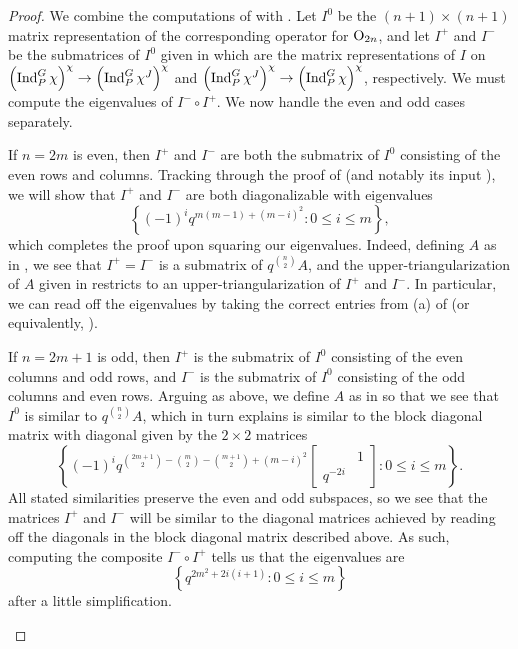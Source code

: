 \begin{proof}
    We combine the computations of  with . Let $I^0$ be the $(n+1)\times(n+1)$ matrix representation of the corresponding operator for $\mathrm{O}_{2n}$, and let $I^+$ and $I^-$ be the submatrices of $I^0$ given in  which are the matrix representations of $I$ on $\left(\operatorname{Ind}_P^G\chi\right)^\chi\to\left(\operatorname{Ind}_P^G\chi^J\right)^\chi$ and $\left(\operatorname{Ind}_P^G\chi^J\right)^\chi\to\left(\operatorname{Ind}_P^G\chi\right)^\chi$, respectively. We must compute the eigenvalues of $I^-\circ I^+$. We now handle the even and odd cases separately.
    \begin{listalph}
        \item If $n=2m$ is even, then $I^+$ and $I^-$ are both the submatrix of $I^0$ consisting of the even rows and columns. Tracking through the proof of  (and notably its input ), we will show that $I^+$ and $I^-$ are both diagonalizable with eigenvalues
        \[\left\{(-1)^{i}q^{m(m-1)+(m-i)^2}:0\le i\le m\right\},\]
        which completes the proof upon squaring our eigenvalues. Indeed, defining $A$ as in , we see that $I^+=I^-$ is a submatrix of $q^{\binom n2}A$, and the upper-triangularization of $A$ given in  restricts to an upper-triangularization of $I^+$ and $I^-$. In particular, we can read off the eigenvalues by taking the correct entries from (a) of  (or equivalently, ).
        \item If $n=2m+1$ is odd, then $I^+$ is the submatrix of $I^0$ consisting of the even columns and odd rows, and $I^-$ is the submatrix of $I^0$ consisting of the odd columns and even rows. Arguing as above, we define $A$ as in  so that we see that $I^0$ is similar to $q^{\binom{n}2}A$, which in turn  explains is similar to the block diagonal matrix with diagonal given by the $2\times2$ matrices
        \[\left\{(-1)^iq^{\binom{2m+1}2-\binom{m}2-\binom{m+1}2+(m-i)^2}\begin{bmatrix}
            & 1 \\
            q^{-2i}
        \end{bmatrix}:0\le i\le m\right\}.\]
        All stated similarities preserve the even and odd subspaces, so we see that the matrices $I^+$ and $I^-$ will be similar to the diagonal matrices achieved by reading off the diagonals in the block diagonal matrix described above. As such, computing the composite $I^-\circ I^+$ tells us that the eigenvalues are
        \[\left\{q^{2m^2+2i(i+1)}:0\le i\le m\right\}\]
        after a little simplification.
        \qedhere
    \end{listalph}
\end{proof}

